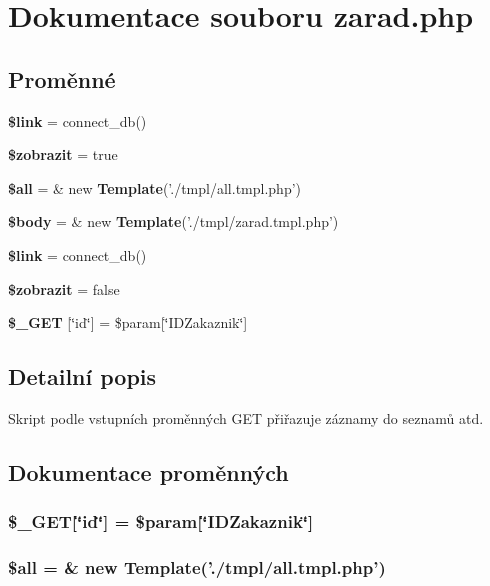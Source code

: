 \section{Dokumentace souboru zarad.php}
\label{zarad_8php}
\subsection*{Proměnné}
\begin{CompactItemize}
\item 
{\bf \$link} = connect\_\-db()
\item 
{\bf \$zobrazit} = true
\item 
{\bf \$all} = \& new {\bf Template}('./tmpl/all.tmpl.php')
\item 
{\bf \$body} = \& new {\bf Template}('./tmpl/zarad.tmpl.php')
\item 
{\bf \$link} = connect\_\-db()
\item 
{\bf \$zobrazit} = false
\item 
{\bf \$\_\-GET} [\char`\"{}id\char`\"{}] = \$param[\char`\"{}IDZakaznik\char`\"{}]
\end{CompactItemize}


\subsection{Detailní popis}
Skript podle vstupních proměnných GET přiřazuje záznamy do seznamů atd. 

\subsection{Dokumentace proměnných}
\subsubsection{\setlength{\rightskip}{0pt plus 5cm}\$\_\-GET[\char`\"{}id\char`\"{}] = \$param[\char`\"{}IDZakaznik\char`\"{}]}\label{zarad_8php_5d1c16275625a8f9ff4cd88d965b22d5}


\subsubsection{\setlength{\rightskip}{0pt plus 5cm}\$all = \& new {\bf Template}('./tmpl/all.tmpl.php')}\label{zarad_8php_3c74ea9d2348c9aba28d36e692bef2d2}


